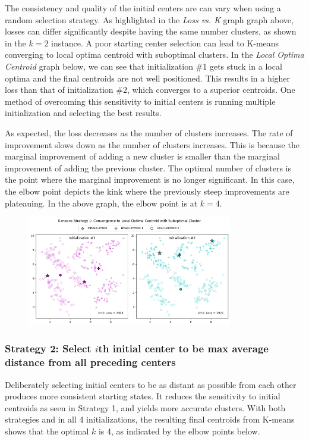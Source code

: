 \documentclass[twocolumn]{article}
\begin{document}
The consistency and quality of the initial centers are can vary when using a random selection strategy. As highlighted in the \textit{Loss vs. K} graph graph above, losses can differ significantly despite having the same number clusters, as shown in the $k=2$ instance. A poor starting center selection can lead to K-means converging to local optima centroid with suboptimal clusters. In the \textit{Local Optima Centroid} graph below, we can see that initialization \#1 gets stuck in a local optima and the final centroids are not well positioned. This results in a higher loss than that of initialization \#2, which converges to a superior centroids. One method of overcoming this sensitivity to initial centers is running multiple initialization and selecting the best results.

As expected, the loss decreases as the number of clusters increases. The rate of improvement slows down as the number of clusters increases. This is because the marginal improvement of adding a new cluster is smaller than the marginal improvement of adding the previous cluster. The optimal number of clusters is the point where the marginal improvement is no longer significant. In this case, the elbow point depicts the kink where the previously steep improvements are plateauing. In the above graph, the elbow point is at $k=4$.

\newpage

\begin{figure}[t]
    \centering
    \includegraphics[width=0.8\textwidth]{cluster_output.png}
\end{figure}

\subsubsection*{Strategy 2: Select $i$th initial center to be max average distance from all preceding centers}

Deliberately selecting initial centers to be as distant as possible from each other produces more consistent starting states. It reduces the sensitivity to initial centroids as seen in Strategy 1, and yields more accurate clusters. With both strategies and in all 4 initializations, the resulting final centroids from K-means shows that the optimal $k$ is 4, as indicated by the elbow points below.
\end{document}
